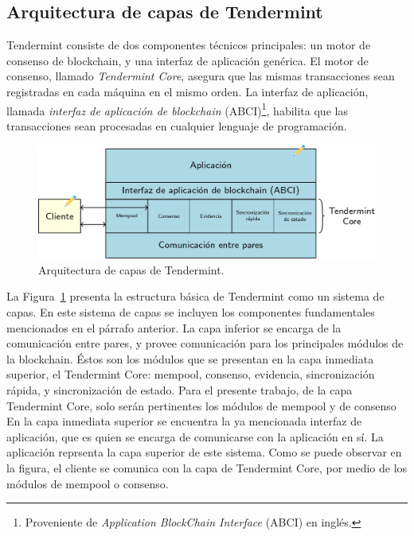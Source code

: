 \subsection{Arquitectura de capas de Tendermint}\label{subsec:layers}
Tendermint consiste de dos componentes técnicos principales: un motor de consenso de blockchain, y una interfaz
de aplicación genérica.
%
El motor de consenso, llamado \textit{Tendermint Core}, asegura que las mismas transacciones sean registradas en cada
máquina en el mismo orden.
%
La interfaz de aplicación, llamada \textit{interfaz de aplicación de blockchain} (ABCI)\footnote{Proveniente de \textit{Application
BlockChain Interface} (ABCI) en inglés.}, habilita que las transacciones
sean procesadas en cualquier lenguaje de programación.

\begin{figure}
  \centering
  \includegraphics[scale=0.3]{figures/tendermint-layers.png}
  \caption{Arquitectura de capas de Tendermint.}
  \label{fig:tendermint-architecture}
\end{figure}

La Figura~\ref{fig:tendermint-architecture} presenta la estructura básica de Tendermint como un sistema de capas.
%
En este sistema de capas se incluyen los componentes fundamentales mencionados en el párrafo anterior.
%
La capa inferior se encarga de la comunicación entre pares, y provee comunicación para los principales
módulos de la blockchain.
%
Éstos son los módulos que se presentan en la capa inmediata superior, el
Tendermint Core: mempool, consenso, evidencia, sincronización rápida, y sincronización de estado.
%
Para el presente trabajo, de la capa Tendermint Core, solo serán pertinentes los módulos de mempool y de consenso
%
En la capa inmediata superior se encuentra la ya mencionada interfaz de aplicación, que es quien se encarga de comunicarse
con la aplicación en sí.
%
La aplicación reprsenta la capa superior de este sistema.
%
Como se puede observar en la figura, el cliente se comunica con la capa de Tendermint Core, por medio de los
módulos de mempool o consenso. 

